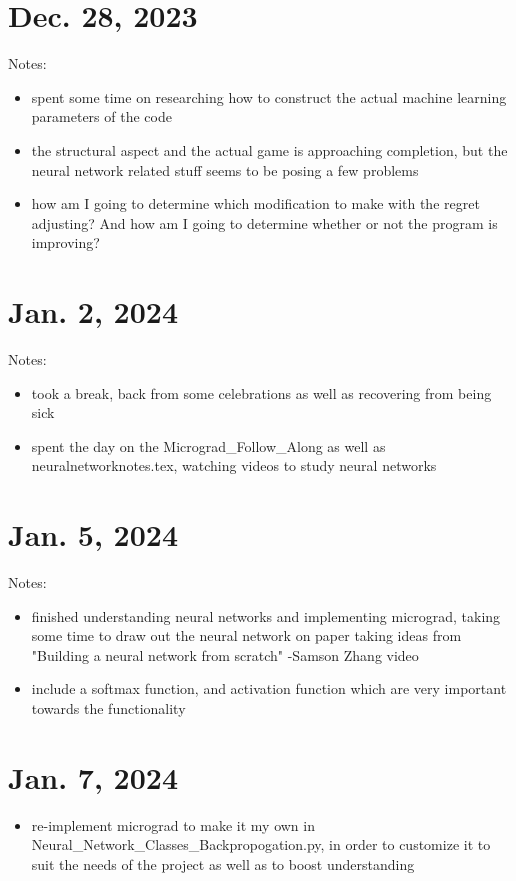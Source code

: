 \documentclass{article}
\begin{document}
\section{Dec. 28, 2023}
Notes:
\begin{itemize}
    \item spent some time on researching how
to construct the actual machine learning parameters
of the code
    \item the structural aspect and the actual game
is approaching completion, but the neural network
related stuff seems to be posing a few problems
    \item how am I going to determine which 
modification to make with the regret adjusting? And 
how am I going to determine whether or not the 
program is improving?
\end{itemize}

\section{Jan. 2, 2024}
Notes:
\begin{itemize}
    \item took a break, back from some celebrations
as well as recovering from being sick
    \item spent the day on the Micrograd_Follow_Along
as well as neuralnetworknotes.tex, watching videos to 
study neural networks
\end{itemize}

\section{Jan. 5, 2024}
Notes:
\begin{itemize}
    \item finished understanding neural networks and 
implementing micrograd, taking some time to draw out
the neural network on paper taking ideas from "Building
a neural network from scratch" -Samson Zhang video
    \item include a softmax function, and activation 
function which are very important towards the 
functionality
\end{itemize}

\section{Jan. 7, 2024} 
\begin{itemize}
    \item re-implement micrograd to make it my own in 
Neural_Network_Classes_Backpropogation.py, in order
to customize it to suit the needs of the project as 
well as to boost understanding
\end{itemize}
\end{document}
